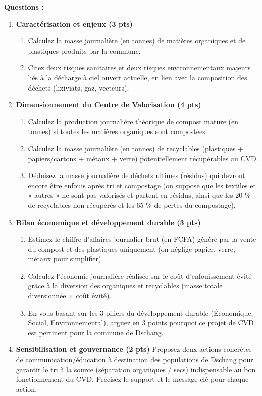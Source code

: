 \documentclass[11pt]{article}
\begin{document}
\begin{exercice}
\textbf{Questions :}

\begin{enumerate}
    \item \textbf{Caractérisation et enjeux (3 pts)}
    \begin{enumerate}
        \item Calculez la masse journalière (en tonnes) de matières organiques et de plastiques produits par la commune.
        \item Citez deux risques sanitaires et deux risques environnementaux majeurs liés à la décharge à ciel ouvert actuelle, en lien avec la composition des déchets (lixiviats, gaz, vecteurs).
    \end{enumerate}

    \item \textbf{Dimensionnement du Centre de Valorisation (4 pts)}
    \begin{enumerate}
        \item Calculez la production journalière théorique de compost mature (en tonnes) si toutes les matières organiques sont compostées.
        \item Calculez la masse journalière (en tonnes) de recyclables (plastiques + papiers/cartons + métaux + verre) potentiellement récupérables au CVD.
        \item Déduisez la masse journalière de déchets ultimes (résidus) qui devront encore être enfouis après tri et compostage (on suppose que les textiles et « autres » ne sont pas valorisés et partent en résidus, ainsi que les 20 \% de recyclables non récupérés et les 65 \% de pertes du compostage).
    \end{enumerate}

    \item \textbf{Bilan économique et développement durable (3 pts)}
    \begin{enumerate}
        \item Estimez le chiffre d'affaires journalier brut (en FCFA) généré par la vente du compost et des plastiques uniquement (on néglige papier, verre, métaux pour simplifier).
        \item Calculez l'économie journalière réalisée sur le coût d'enfouissement évité grâce à la diversion des organiques et recyclables (masse totale diversionnée $\times$ coût évité).
        \item En vous basant sur les 3 piliers du développement durable (Économique, Social, Environnemental), arguez en 3 points pourquoi ce projet de CVD est pertinent pour la commune de Dschang.
    \end{enumerate}

    \item \textbf{Sensibilisation et gouvernance (2 pts)}
    Proposez deux actions concrètes de communication/éducation à destination des populations de Dschang pour garantir le tri à la source (séparation organiques / secs) indispensable au bon fonctionnement du CVD. Précisez le support et le message clé pour chaque action.
\end{enumerate}
\end{exercice}
\end{document}
